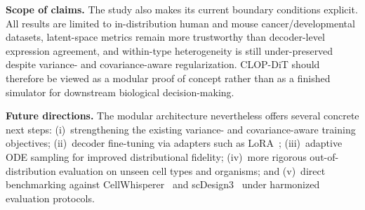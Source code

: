 \documentclass[11pt,a4paper]{article}
\begin{document}
\textbf{Scope of claims.} The study also makes its current boundary conditions explicit. All results are limited to in-distribution human and mouse cancer/developmental datasets, latent-space metrics remain more trustworthy than decoder-level expression agreement, and within-type heterogeneity is still under-preserved despite variance- and covariance-aware regularization. CLOP-DiT should therefore be viewed as a modular proof of concept rather than as a finished simulator for downstream biological decision-making.

\textbf{Future directions.} The modular architecture nevertheless offers several concrete next steps: (i)~strengthening the existing variance- and covariance-aware training objectives; (ii)~decoder fine-tuning via adapters such as LoRA~\cite{ref-scgpt}; (iii)~adaptive ODE sampling for improved distributional fidelity; (iv)~more rigorous out-of-distribution evaluation on unseen cell types and organisms; and (v)~direct benchmarking against CellWhisperer~\cite{ref-cellwhisperer} and scDesign3~\cite{ref-scdesign3} under harmonized evaluation protocols.





\end{document}
